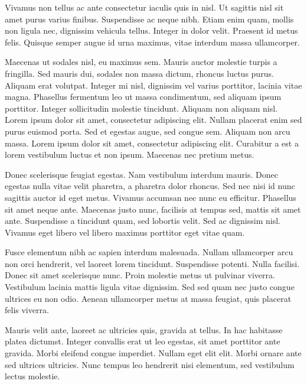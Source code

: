 Vivamus non tellus ac ante consectetur iaculis quis in nisl. Ut sagittis nisl sit amet purus varius finibus. Suspendisse ac neque nibh. Etiam enim quam, mollis non ligula nec, dignissim vehicula tellus. Integer in dolor velit. Praesent id metus felis. Quisque semper augue id urna maximus, vitae interdum massa ullamcorper.

Maecenas ut sodales nisl, eu maximus sem. Mauris auctor molestie turpis a fringilla. Sed mauris dui, sodales non massa dictum, rhoncus luctus purus. Aliquam erat volutpat. Integer mi nisl, dignissim vel varius porttitor, lacinia vitae magna. Phasellus fermentum leo ut massa condimentum, sed aliquam ipsum porttitor. Integer sollicitudin molestie tincidunt. Aliquam non aliquam nisl. Lorem ipsum dolor sit amet, consectetur adipiscing elit. Nullam placerat enim sed purus euismod porta. Sed et egestas augue, sed congue sem. Aliquam non arcu massa. Lorem ipsum dolor sit amet, consectetur adipiscing elit. Curabitur a est a lorem vestibulum luctus et non ipsum. Maecenas nec pretium metus.

Donec scelerisque feugiat egestas. Nam vestibulum interdum mauris. Donec egestas nulla vitae velit pharetra, a pharetra dolor rhoncus. Sed nec nisi id nunc sagittis auctor id eget metus. Vivamus accumsan nec nunc eu efficitur. Phasellus sit amet neque ante. Maecenas justo nunc, facilisis at tempus sed, mattis sit amet ante. Suspendisse a tincidunt quam, sed lobortis velit. Sed ac dignissim nisl. Vivamus eget libero vel libero maximus porttitor eget vitae quam.

Fusce elementum nibh ac sapien interdum malesuada. Nullam ullamcorper arcu non orci hendrerit, vel laoreet lorem tincidunt. Suspendisse potenti. Nulla facilisi. Donec sit amet scelerisque nunc. Proin molestie metus ut pulvinar viverra. Vestibulum lacinia mattis ligula vitae dignissim. Sed sed quam nec justo congue ultrices eu non odio. Aenean ullamcorper metus at massa feugiat, quis placerat felis viverra.

Mauris velit ante, laoreet ac ultricies quis, gravida at tellus. In hac habitasse platea dictumst. Integer convallis erat ut leo egestas, sit amet porttitor ante gravida. Morbi eleifend congue imperdiet. Nullam eget elit elit. Morbi ornare ante sed ultrices ultricies. Nunc tempus leo hendrerit nisi elementum, sed vestibulum lectus molestie. 
